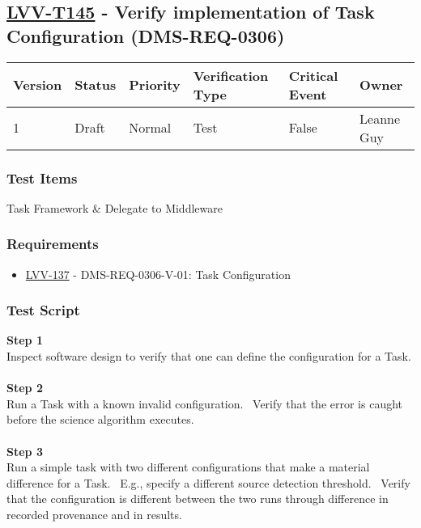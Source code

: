 \hypertarget{lvv-t145---verify-implementation-of-task-configuration-dms-req-0306}{%
\subsection{\texorpdfstring{\href{https://jira.lsstcorp.org/secure/Tests.jspa\#/testCase/LVV-T145}{LVV-T145}
- Verify implementation of Task Configuration
(DMS-REQ-0306)}{LVV-T145 - Verify implementation of Task Configuration (DMS-REQ-0306)}}\label{lvv-t145---verify-implementation-of-task-configuration-dms-req-0306}}

\begin{longtable}[]{@{}llllll@{}}
\toprule
Version & Status & Priority & Verification Type & Critical Event &
Owner\tabularnewline
\midrule
\endhead
1 & Draft & Normal & Test & False & Leanne Guy\tabularnewline
\bottomrule
\end{longtable}

\hypertarget{test-items-121}{%
\subsubsection{Test Items}\label{test-items-121}}

Task Framework \& Delegate to Middleware

\hypertarget{requirements-122}{%
\subsubsection{Requirements}\label{requirements-122}}

\begin{itemize}
\tightlist
\item
  \href{https://jira.lsstcorp.org/browse/LVV-137}{LVV-137} -
  DMS-REQ-0306-V-01: Task Configuration
\end{itemize}

\hypertarget{test-script-122}{%
\subsubsection{Test Script}\label{test-script-122}}

\textbf{Step 1}\\
Inspect software design to verify that one can define the configuration
for a Task.\\
~\\
\textbf{Step 2}\\
Run a Task with a known invalid configuration. ~Verify that the error is
caught before the science algorithm executes.\\
~\\
\textbf{Step 3}\\
Run a simple task with two different configurations that make a material
difference for a Task. ~E.g., specify a different source detection
threshold. ~Verify that the configuration is different between the two
runs through difference in recorded provenance and in results.\\
~\\

